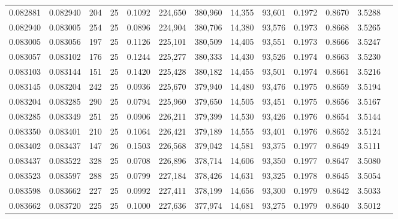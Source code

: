 \begin{tabular}{rrrrrrrrrrrrr}
0.082881 & 0.082940 &   204 &  25 &                                     0.1092 & 224,650 & 380,960 &  14,355 &  93,601 & 0.1972 & 0.8670 & 3.5288 \\
0.082940 & 0.083005 &   254 &  25 &                                     0.0896 & 224,904 & 380,706 &  14,380 &  93,576 & 0.1973 & 0.8668 & 3.5265 \\
0.083005 & 0.083056 &   197 &  25 &                                     0.1126 & 225,101 & 380,509 &  14,405 &  93,551 & 0.1973 & 0.8666 & 3.5247 \\
0.083057 & 0.083102 &   176 &  25 &                                     0.1244 & 225,277 & 380,333 &  14,430 &  93,526 & 0.1974 & 0.8663 & 3.5230 \\
0.083103 & 0.083144 &   151 &  25 &                                     0.1420 & 225,428 & 380,182 &  14,455 &  93,501 & 0.1974 & 0.8661 & 3.5216 \\
0.083145 & 0.083204 &   242 &  25 &                                     0.0936 & 225,670 & 379,940 &  14,480 &  93,476 & 0.1975 & 0.8659 & 3.5194 \\
0.083204 & 0.083285 &   290 &  25 &                                     0.0794 & 225,960 & 379,650 &  14,505 &  93,451 & 0.1975 & 0.8656 & 3.5167 \\
0.083285 & 0.083349 &   251 &  25 &                                     0.0906 & 226,211 & 379,399 &  14,530 &  93,426 & 0.1976 & 0.8654 & 3.5144 \\
0.083350 & 0.083401 &   210 &  25 &                                     0.1064 & 226,421 & 379,189 &  14,555 &  93,401 & 0.1976 & 0.8652 & 3.5124 \\
0.083402 & 0.083437 &   147 &  26 &                                     0.1503 & 226,568 & 379,042 &  14,581 &  93,375 & 0.1977 & 0.8649 & 3.5111 \\
0.083437 & 0.083522 &   328 &  25 &                                     0.0708 & 226,896 & 378,714 &  14,606 &  93,350 & 0.1977 & 0.8647 & 3.5080 \\
0.083523 & 0.083597 &   288 &  25 &                                     0.0799 & 227,184 & 378,426 &  14,631 &  93,325 & 0.1978 & 0.8645 & 3.5054 \\
0.083598 & 0.083662 &   227 &  25 &                                     0.0992 & 227,411 & 378,199 &  14,656 &  93,300 & 0.1979 & 0.8642 & 3.5033 \\
0.083662 & 0.083720 &   225 &  25 &                                     0.1000 & 227,636 & 377,974 &  14,681 &  93,275 & 0.1979 & 0.8640 & 3.5012 \\

\end{tabular}
